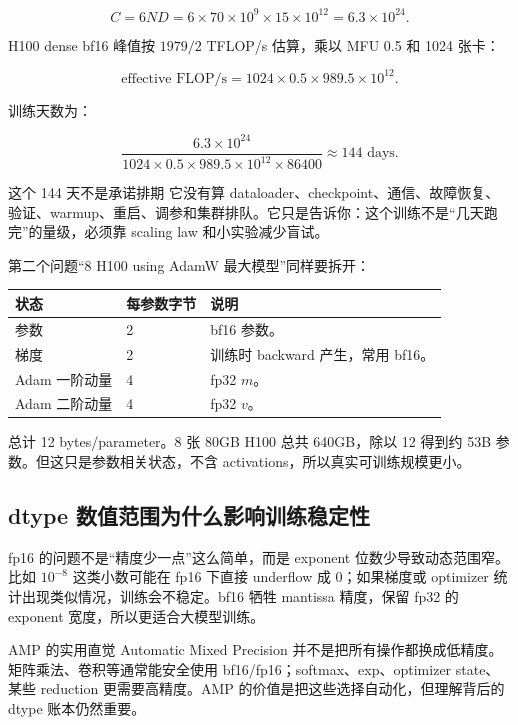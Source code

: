 \documentclass[a4paper]{article}
\begin{document}
\[
C = 6ND = 6\times 70\times 10^9\times 15\times 10^{12}=6.3\times 10^{24}.
\]

H100 dense bf16 峰值按 \(1979/2\) TFLOP/s 估算，乘以 MFU 0.5 和 1024 张卡：

\[
\text{effective FLOP/s}=1024\times 0.5\times 989.5\times 10^{12}.
\]

训练天数为：

\[
\frac{6.3\times 10^{24}}{1024\times 0.5\times 989.5\times 10^{12}\times 86400}\approx 144\text{ days}.
\]

\begin{warningbox}{这个 144 天不是承诺排期}
它没有算 dataloader、checkpoint、通信、故障恢复、验证、warmup、重启、调参和集群排队。它只是告诉你：这个训练不是“几天跑完”的量级，必须靠 scaling law 和小实验减少盲试。
\end{warningbox}

第二个问题“8 H100 using AdamW 最大模型”同样要拆开：

\begin{longtable}{p{}p{}p{}}
\toprule
\textbf{状态} & \textbf{每参数字节} & \textbf{说明} \\
\midrule
参数 & 2 & bf16 参数。 \\
梯度 & 2 & 训练时 backward 产生，常用 bf16。 \\
Adam 一阶动量 & 4 & fp32 \(m\)。 \\
Adam 二阶动量 & 4 & fp32 \(v\)。 \\
\bottomrule
\end{longtable}

总计 12 bytes/parameter。8 张 80GB H100 总共 640GB，除以 12 得到约 53B 参数。但这只是参数相关状态，不含 activations，所以真实可训练规模更小。

\subsection{dtype 数值范围为什么影响训练稳定性}

fp16 的问题不是“精度少一点”这么简单，而是 exponent 位数少导致动态范围窄。比如 \(10^{-8}\) 这类小数可能在 fp16 下直接 underflow 成 0；如果梯度或 optimizer 统计出现类似情况，训练会不稳定。bf16 牺牲 mantissa 精度，保留 fp32 的 exponent 宽度，所以更适合大模型训练。

\begin{knowledgebox}{AMP 的实用直觉}
Automatic Mixed Precision 并不是把所有操作都换成低精度。矩阵乘法、卷积等通常能安全使用 bf16/fp16；softmax、exp、optimizer state、某些 reduction 更需要高精度。AMP 的价值是把这些选择自动化，但理解背后的 dtype 账本仍然重要。
\end{knowledgebox}
\end{document}
